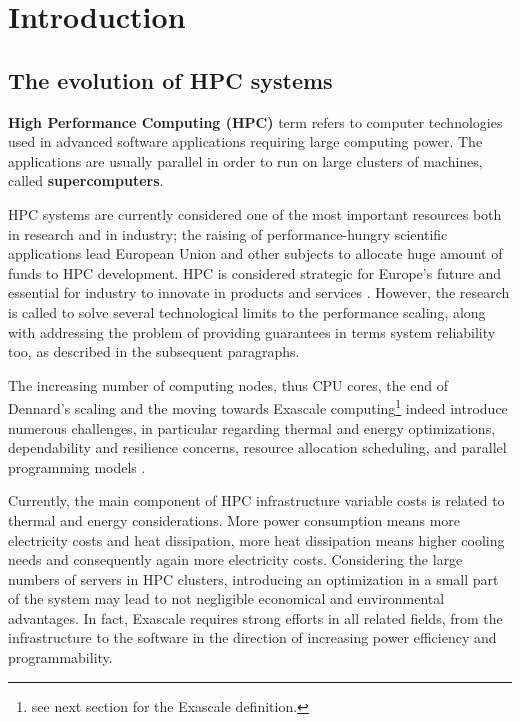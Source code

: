 \chapter{Introduction}
\label{cap:introduction}
\iffalse
\section{The evolution of HPC systems}
\textbf{High Performance Computing (HPC)} term refers to computer technologies
used in advanced software applications requiring large computing power. The
applications are usually parallel in order to run on large clusters of
machines, called \textbf{supercomputers}.

HPC systems are currently considered one
of the most important resources both in research and in industry; the raising
of performance-hungry scientific applications lead European Union and other
subjects to allocate huge amount of funds to HPC development. HPC is 
considered strategic
for Europe's future and essential for industry to innovate in products and
services \cite{EUstrategy}. However, the research is called to solve several
technological limits to the performance scaling, along with addressing
the problem of providing guarantees in terms system reliability too, as
described in the subsequent paragraphs.

The increasing number of computing nodes, thus CPU cores, the end of
Dennard's scaling \cite{esmaeilzadeh2011dark} and the moving towards Exascale
computing\footnote{see next section for the Exascale definition.} indeed
introduce numerous challenges, in particular regarding thermal and energy
optimizations, dependability and resilience concerns, resource allocation
scheduling, and parallel programming models \cite{shalf2010exascale}.

Currently, the main component of HPC infrastructure variable costs is related
to thermal and energy considerations. More power consumption means more
electricity costs and heat dissipation, more heat dissipation means higher
cooling needs and consequently again more electricity costs. Considering the
large numbers of servers in HPC clusters, introducing an optimization in a
small part of the system may lead to not negligible economical
and environmental advantages. In fact, Exascale requires strong efforts in all
related fields, from the infrastructure to the software in the direction of
increasing power efficiency and programmability.

